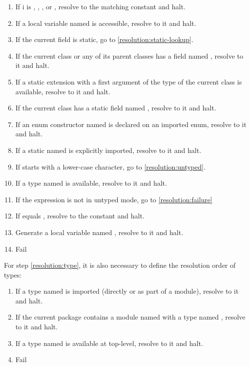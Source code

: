 \documentclass{haxe}
\begin{document}
\begin{enumerate}
	\item If i is , , ,  or , resolve to the matching constant and halt.
	\item If a local variable named  is accessible, resolve to it and halt.
	\item If the current field is static, go to \ref{resolution:static-lookup}.
	\item If the current class or any of its parent classes has a field named , resolve to it and halt.
	\item\label{resolution:static-extension} If a static extension with a first argument of the type of the current class is available, resolve to it and halt.
	\item\label{resolution:static-lookup} If the current class has a static field named , resolve to it and halt.
	\item\label{resolution:enum-ctor} If an enum constructor named  is declared on an imported enum, resolve to it and halt.
	\item If a static named  is explicitly imported, resolve to it and halt.
	\item If  starts with a lower-case character, go to \ref{resolution:untyped}.
	\item\label{resolution:type} If a type named  is available, resolve to it and halt.
	\item\label{resolution:untyped} If the expression is not in untyped mode, go to \ref{resolution:failure}
	\item If  equals , resolve to the  constant and halt.
	\item Generate a local variable named , resolve to it and halt.
	\item\label{resolution:failure} Fail
\end{enumerate}

For step \ref{resolution:type}, it is also necessary to define the resolution order of types:

\begin{enumerate}
	\item\label{resolution:import} If a type named  is imported (directly or as part of a module), resolve to it and halt.
	\item If the current package contains a module named  with a type named , resolve to it and halt.
	\item If a type named  is available at top-level, resolve to it and halt.
	\item Fail
\end{enumerate}
\end{document}

